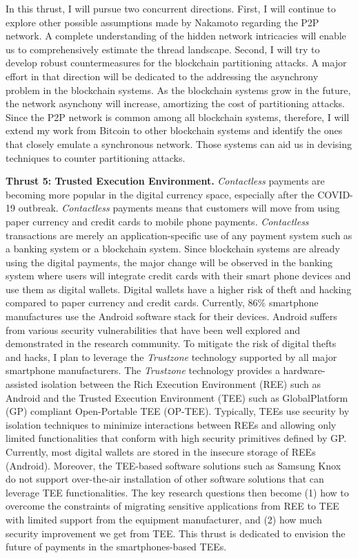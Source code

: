 \documentclass{NSF}
\newcommand{\BfPara}[1]{{\noindent\textbf{#1.}}\xspace}
\begin{document}
In this thrust, I will pursue two concurrent directions. First, I will continue to explore other possible assumptions made by Nakamoto regarding the P2P network. A complete understanding of the hidden network intricacies will enable us to comprehensively estimate the thread landscape. Second, I will try to develop robust countermeasures for the blockchain partitioning attacks. A major effort in that direction will be dedicated to the addressing the asynchrony problem in the blockchain systems. As the blockchain systems grow in the future, the network asynchony will increase, amortizing the cost of partitioning attacks. Since the P2P network is common among all blockchain systems, therefore, I will extend my work from Bitcoin to other blockchain systems and identify the ones that closely emulate a synchronous network. Those systems can aid us in devising techniques to counter partitioning attacks. 


\BfPara{Thrust 5: Trusted Execution Environment} {\em Contactless} payments are becoming more popular in the digital currency space, especially after the COVID-19 outbreak. {\em Contactless} payments means that customers will move from using paper currency and credit cards to mobile phone payments. {\em Contactless} transactions are merely an application-specific use of any payment system such as a banking system or a blockchain system. Since blockchain systems are already using the digital payments, the major change will be observed in the banking system where users will integrate credit cards with their smart phone devices and use them as digital wallets. Digital wallets have a higher risk of theft and hacking compared to paper currency and credit cards. Currently, 86\% smartphone manufactures use the Android software stack for their devices. Android suffers from various security vulnerabilities that have been well explored and demonstrated in the research community. To mitigate the risk of digital thefts and hacks, I plan to leverage the {\em Trustzone} technology supported by all major smartphone manufacturers. The {\em Trustzone} technology provides a hardware-assisted isolation between the Rich Execution Environment (REE) such as Android and the Trusted Execution Environment (TEE) such as GlobalPlatform (GP) compliant Open-Portable TEE (OP-TEE). Typically, TEEs use security by isolation techniques to minimize interactions between REEs and allowing only limited functionalities that conform with high security primitives defined by GP. Currently, most digital wallets are stored in the insecure storage of REEs (Android). Moreover, the TEE-based software solutions such as Samsung Knox do not support over-the-air installation of other software solutions that can leverage TEE functionalities. The key research questions then become (1) how to overcome the constraints of migrating sensitive applications from REE to TEE with limited support from the equipment manufacturer, and (2) how much security improvement we get from TEE. This thrust is dedicated to envision the future of payments in the smartphones-based TEEs. 
\end{document}
